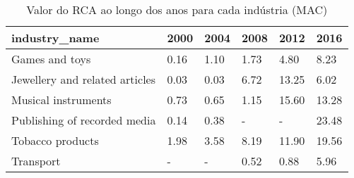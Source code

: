 \begin{table}
\centering
\caption{Valor do RCA ao longo dos anos para cada indústria (MAC)}
\begin{tabular}{p{6cm}p{1.5cm}p{1.5cm}p{1.5cm}p{1.5cm}p{1.5cm}}
\toprule
                 industry\_name & 2000 & 2004 & 2008 &  2012 &  2016 \\
\midrule
                Games and toys & 0.16 & 1.10 & 1.73 &  4.80 &  8.23 \\
Jewellery and related articles & 0.03 & 0.03 & 6.72 & 13.25 &  6.02 \\
           Musical instruments & 0.73 & 0.65 & 1.15 & 15.60 & 13.28 \\
  Publishing of recorded media & 0.14 & 0.38 &    - &     - & 23.48 \\
              Tobacco products & 1.98 & 3.58 & 8.19 & 11.90 & 19.56 \\
                     Transport &    - &    - & 0.52 &  0.88 &  5.96 \\
\bottomrule
\end{tabular}
\end{table}

